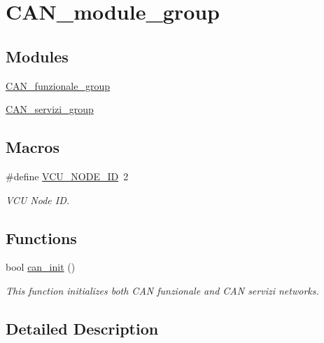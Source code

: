 \hypertarget{group___c_a_n__module__group}{}\section{C\+A\+N\+\_\+module\+\_\+group}
\label{group___c_a_n__module__group}
\subsection*{Modules}
\begin{DoxyCompactItemize}
\item 
\mbox{\hyperlink{group___c_a_n__funzionale__group}{C\+A\+N\+\_\+funzionale\+\_\+group}}
\item 
\mbox{\hyperlink{group___c_a_n__servizi__group}{C\+A\+N\+\_\+servizi\+\_\+group}}
\end{DoxyCompactItemize}
\subsection*{Macros}
\begin{DoxyCompactItemize}
\item 
\mbox{\label{group___c_a_n__module__group_ga5703fd8de5ab8d0dcedb561f2178829e}} 
\#define \mbox{\hyperlink{group___c_a_n__module__group_ga5703fd8de5ab8d0dcedb561f2178829e}{V\+C\+U\+\_\+\+N\+O\+D\+E\+\_\+\+ID}}~2
\begin{DoxyCompactList}\small\item\em V\+CU Node ID. \end{DoxyCompactList}\end{DoxyCompactItemize}
\subsection*{Functions}
\begin{DoxyCompactItemize}
\item 
bool \mbox{\hyperlink{group___c_a_n__module__group_ga36b6b5924eb84ef2e4c2bd548b28436f}{can\+\_\+init}} ()
\begin{DoxyCompactList}\small\item\em This function initializes both C\+AN funzionale and C\+AN servizi networks. \end{DoxyCompactList}\end{DoxyCompactItemize}


\subsection{Detailed Description}


